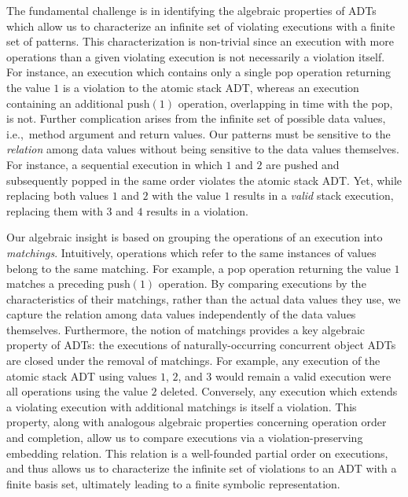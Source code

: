 The fundamental challenge is in identifying the algebraic properties of ADTs
which allow us to characterize an infinite set of violating executions with a
finite set of patterns. This characterization is non-trivial since an execution
with more operations than a given violating execution is not necessarily a
violation itself. For instance, an execution which contains only a single
pop operation returning the value $1$ is a violation to the atomic stack
ADT, whereas an execution containing an additional push$(1)$ operation,
overlapping in time with the pop, is not. Further complication arises
from the infinite set of possible data values, i.e.,~method argument and return
values. Our patterns must be sensitive to the \emph{relation} among data values
without being sensitive to the data values themselves. For instance, a
sequential execution in which $1$ and $2$ are pushed and subsequently
popped in the same order violates the atomic stack ADT. Yet, while replacing
both values $1$ and $2$ with the value $1$ results in a
\emph{valid} stack execution, replacing them with $3$ and $4$ results
in a violation.

Our algebraic insight is based on grouping the operations of an execution into
\emph{matchings}. Intuitively, operations which refer to the same instances of
values belong to the same matching. For example, a pop operation
returning the value $1$ matches a preceding push$(1)$ operation. By
comparing executions by the characteristics of their matchings, rather than the
actual data values they use, we capture the relation among data values
independently of the data values themselves. Furthermore, the notion of
matchings provides a key algebraic property of ADTs: the executions of
naturally-occurring concurrent object ADTs are closed under the removal of
matchings. For example, any execution of the atomic stack ADT using values
$1$, $2$, and $3$ would remain a valid execution were all operations
using the value $2$ deleted. Conversely, any execution which extends a
violating execution with additional matchings is itself a violation. This
property, along with analogous algebraic properties concerning operation order
and completion, allow us to compare executions via a violation-preserving
embedding relation. This relation is a well-founded partial order on
executions, and thus allows us to characterize the infinite set of violations
to an ADT with a finite basis set, ultimately leading to a finite symbolic
representation.

